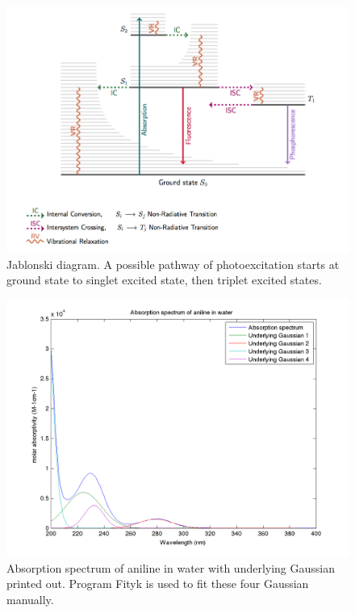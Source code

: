 \documentclass[
journal=jpcbfk, %
manuscript=article]{achemso}
\begin{document}
\begin{figure}[htb]
	\centering		
	\includegraphics[width=1\textwidth]{jablonski.png}
	\caption{Jablonski diagram. A possible pathway of photoexcitation starts at ground state to singlet excited state, then triplet excited states.}
	\label{fig:jablonski}
\end{figure}
\begin{figure}[htb]
	\centering		
	\includegraphics[width=1\textwidth]{UVFromFityk.png}
	\caption{Absorption spectrum of aniline in water with underlying Gaussian printed out. Program Fityk is used to fit these four Gaussian manually.}
	\label{fig:UVFromFityk}
\end{figure}
\end{document}
